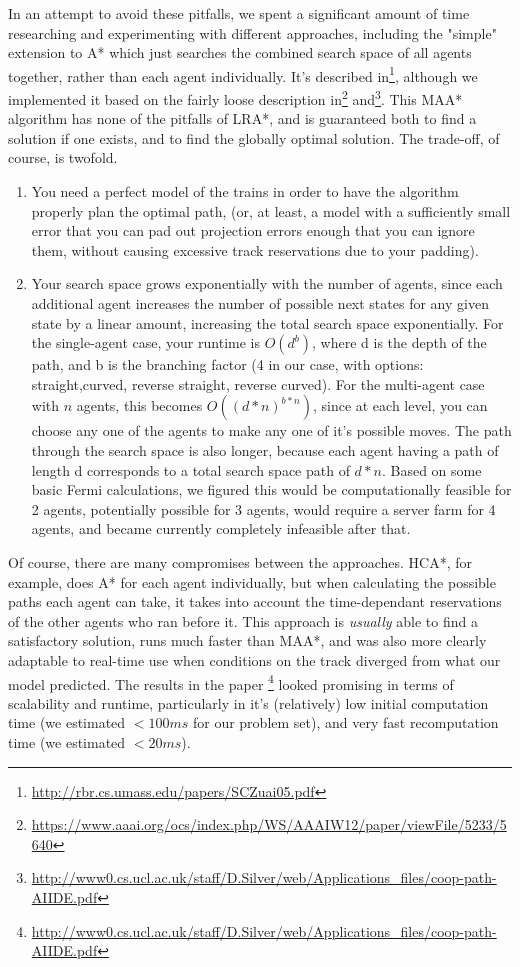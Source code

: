 \documentclass{article}
\begin{document}
In an attempt to avoid these pitfalls, we spent a significant amount of time
researching and experimenting with different approaches, including the "simple"
extension to A* which just searches the combined search space of all agents
together, rather than each agent individually. It's described
in\footnote{\url{http://rbr.cs.umass.edu/papers/SCZuai05.pdf}}, although we
implemented it based on the fairly loose description
in\footnote{\url{https://www.aaai.org/ocs/index.php/WS/AAAIW12/paper/viewFile/5233/5640}}
and\footnote{\url{http://www0.cs.ucl.ac.uk/staff/D.Silver/web/Applications_files/coop-path-AIIDE.pdf}}.
This MAA* algorithm has none of the pitfalls of LRA*, and is
guaranteed both to find a solution if one exists, and to find the globally
optimal solution. The trade-off, of course, is twofold.
\begin{enumerate}
\item You need a perfect model of the trains in order to have the algorithm
	properly plan the optimal path, (or, at least, a model with a sufficiently
	small error that you can pad out projection errors enough that you can
	ignore them, without causing excessive track reservations due to your
	padding).
\item Your search space grows exponentially with the number of agents, since
	each additional agent increases the number of possible next states for
	any given state by a linear amount, increasing the total search space
	exponentially. For the single-agent case, your runtime is $O(d^b)$,
	where d is the depth of the path, and b is the branching factor
	(4 in our case, with options: straight,curved, reverse straight,
	reverse curved). For the multi-agent case with $n$ agents, this becomes
	$O((d*n)^{b*n})$,
	since at each level, you can choose any one of the agents to make any one
	of it's possible moves. The path through the search space is also longer,
	because each agent having a path of length d corresponds to a total search
	space path of $d*n$. Based on some basic Fermi calculations, we figured
	this would be computationally feasible for 2 agents, potentially possible
	for 3 agents, would require a server farm for 4 agents, and became currently
	completely infeasible after that.
\end{enumerate}

Of course, there are many compromises between the approaches. HCA*, for
example, does A* for each agent individually, but when calculating the possible
paths each agent can take, it takes into account the time-dependant reservations
of the other agents who ran before it. This approach is \emph{usually} able to
find a satisfactory solution, runs much faster than MAA*, and was also more
clearly adaptable to real-time use when conditions on the track diverged from
what our model predicted. The results in the paper
\footnote{\url{http://www0.cs.ucl.ac.uk/staff/D.Silver/web/Applications_files/coop-path-AIIDE.pdf}}
looked promising in terms of scalability and runtime, particularly in it's
(relatively) low initial computation time (we estimated $<100ms$ for our problem
set), and very fast recomputation time (we estimated $<20ms$).
\end{document}
